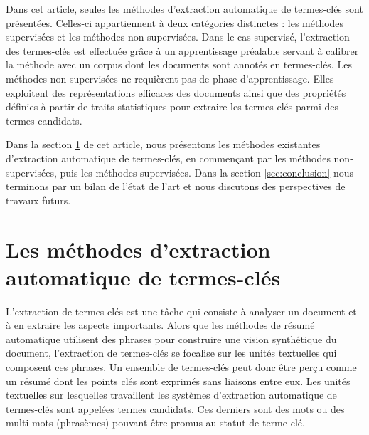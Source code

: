   Dans cet article, seules les méthodes d'extraction automatique de termes-clés
  sont présentées. Celles-ci appartiennent à deux catégories distinctes : les
  méthodes supervisées et les méthodes non-supervisées. Dans le cas supervisé,
  l'extraction des termes-clés est effectuée grâce à un apprentissage préalable
  servant à calibrer la méthode avec un corpus dont les documents sont annotés
  en termes-clés. Les méthodes non-supervisées ne requièrent pas de phase
  d'apprentissage. Elles exploitent des représentations efficaces des documents
  ainsi que des propriétés définies à partir de traits statistiques pour
  extraire les termes-clés parmi des termes candidats.

  Dans la section \ref{sec:methods} de cet article, nous présentons les méthodes
  existantes d'extraction automatique de termes-clés, en commençant par les
  méthodes non-supervisées, puis les méthodes supervisées. Dans la section
  \ref{sec:conclusion} nous terminons par un bilan de l'état de l'art et nous
  discutons des perspectives de travaux futurs.

\section{Les méthodes d'extraction automatique de termes-clés}
\label{sec:methods}
  L'extraction de termes-clés est une tâche qui consiste à analyser un document
  et à en extraire les aspects importants. Alors que les méthodes de résumé
  automatique utilisent des phrases pour construire une vision synthétique du
  document, l'extraction de termes-clés se focalise sur les unités textuelles
  qui composent ces phrases. Un ensemble de termes-clés peut donc être perçu
  comme un résumé dont les points clés sont exprimés sans liaisons entre eux.
  Les unités textuelles sur lesquelles travaillent les systèmes d'extraction
  automatique de termes-clés sont appelées termes candidats. Ces derniers sont
  des mots ou des multi-mots (phrasèmes) pouvant être promus au statut de
  terme-clé.

